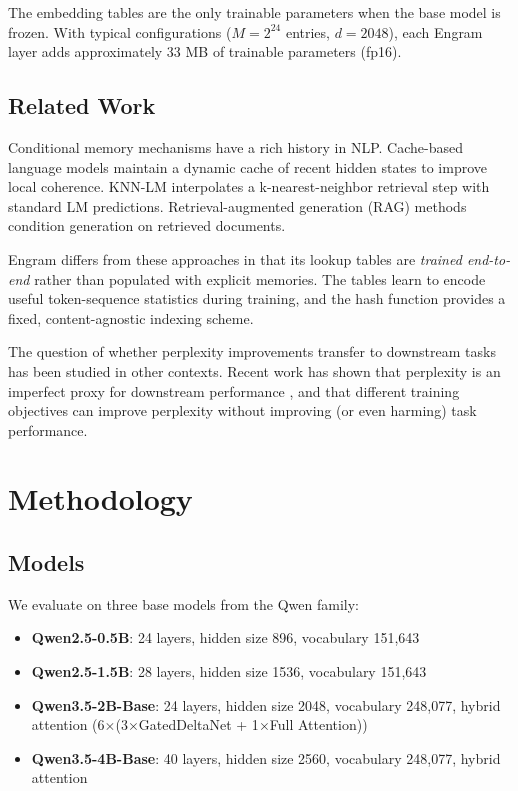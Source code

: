 \documentclass{article}
\begin{document}
The embedding tables are the only trainable parameters when the base model is frozen. With typical configurations ($M = 2^{24}$ entries, $d = 2048$), each Engram layer adds approximately 33 MB of trainable parameters (fp16).

\subsection{Related Work}

Conditional memory mechanisms have a rich history in NLP. Cache-based language models \cite{grave2017improving} maintain a dynamic cache of recent hidden states to improve local coherence. KNN-LM \cite{khandelwal2020generalization} interpolates a k-nearest-neighbor retrieval step with standard LM predictions. Retrieval-augmented generation (RAG) methods \cite{lewis2020retrieval} condition generation on retrieved documents.

Engram differs from these approaches in that its lookup tables are \emph{trained end-to-end} rather than populated with explicit memories. The tables learn to encode useful token-sequence statistics during training, and the hash function provides a fixed, content-agnostic indexing scheme.

The question of whether perplexity improvements transfer to downstream tasks has been studied in other contexts. Recent work has shown that perplexity is an imperfect proxy for downstream performance \cite{liu2023lost}, and that different training objectives can improve perplexity without improving (or even harming) task performance.

\section{Methodology}

\subsection{Models}

We evaluate on three base models from the Qwen family:
\begin{itemize}[nosep]
    \item \textbf{Qwen2.5-0.5B}: 24 layers, hidden size 896, vocabulary 151,643
    \item \textbf{Qwen2.5-1.5B}: 28 layers, hidden size 1536, vocabulary 151,643
    \item \textbf{Qwen3.5-2B-Base}: 24 layers, hidden size 2048, vocabulary 248,077, hybrid attention (6$\times$(3$\times$GatedDeltaNet + 1$\times$Full Attention))
    \item \textbf{Qwen3.5-4B-Base}: 40 layers, hidden size 2560, vocabulary 248,077, hybrid attention
\end{itemize}
\end{document}
